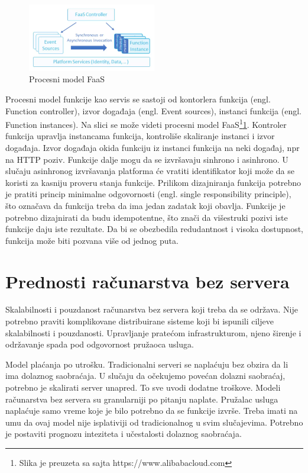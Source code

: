 \documentclass[12pt,oneside]{memoir}
\begin{document}
\begin{figure}[!ht]
  \centering
  \includegraphics[width=0.5\textwidth]{Slika 7.png}
  \caption{Procesni model FaaS}
  \label{fig:faasProcesniModel}
\end{figure}


Procesni model funkcije kao servis se sastoji od kontorlera funkcija (engl. Function controller), izvor događaja (engl. Event sources), instanci funkcija (engl. Function instances). Na slici se može videti procesni model FaaS\footnote{Slika je preuzeta sa sajta https://www.alibabacloud.com}\ref{fig:faasProcesniModel}. Kontroler funkcija upravlja instancama funkcija, kontroliše skaliranje instanci i izvor događaja. Izvor događaja okida funkciju iz instanci funkcija na neki događaj, npr na HTTP poziv. Funkcije dalje mogu da se izvršavaju sinhrono i asinhrono. U slučaju asinhronog izvršavanja platforma će vratiti identifikator koji može da se koristi za kasniju proveru stanja funkcije\cite{sah}. Prilikom dizajniranja funkcija potrebno je pratiti princip minimalne odgovornosti (engl. single responsibility principle), što označava da funkcija treba da ima jedan zadatak koji obavlja. Funkcije je potrebno dizajnirati da budu idempotentne, što znači da višestruki pozivi iste funkcije daju iste rezultate. Da bi se obezbedila redudantnost i visoka dostupnost, funkcija može biti pozvana više od jednog puta\cite{sah}. 

\section{Prednosti računarstva bez servera}

Skalabilnosti i pouzdanost računarstva bez servera koji treba da se održava. Nije potrebno praviti komplikovane distribuirane sisteme koji bi ispunili ciljeve skalabilnosti i pouzdanosti. Upravljanje pratećom infrastrukturom, njeno širenje i održavanje spada pod odgovornost pružaoca usluga.

Model plaćanja po utrošku. Tradicionalni serveri se naplaćuju bez obzira da li ima dolaznog saobraćaja. U slučaju da očekujemo povećan dolazni saobraćaj, potrebno je skalirati server unapred. To sve uvodi dodatne troškove. Modeli računarstva bez servera su granularniji po pitanju naplate. Pružalac usluga naplaćuje samo vreme koje je bilo potrebno da se funkcije izvrše. Treba imati na umu da ovaj model nije isplativiji od tradicionalnog u svim slučajevima\cite{sa}. Potrebno je postaviti prognozu inteziteta i učestalosti dolaznog saobraćaja.
\end{document}
